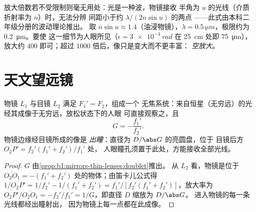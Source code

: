 \begin{remark}[分辨极限]\label{rem:b1:optical-instruments:abbe}
放大倍数若不受限制则毫无用处：光是一种波，物镜接收
半角为 $u$ 的光线（介质折射率为 $n$）时，无法分辨
间距小于约 $\lambda/(2n\sin u)$ 的两点
——此式由本科二年级分册的波动理论推出。
取 $n\sin u \approx 1.4$（油浸物镜），$\lambda =
\qty{0.5}{\micro m}$，极限约为 \qty{0.2}{\micro m}。要使
这一细节为人眼所见（$\epsilon = \qty{3e-4}{rad}$
在 \qty{25}{cm} 处即 \qty{75}{\micro m}），放大约 $400$
即可；超过 $1000$ 倍后，像只是变大而不更丰富：
\emph{空放大}。
\end{remark}

\section{天文望远镜}

\begin{proposition}[折射式望远镜]\label{prop:b1:optical-instruments:telescope}
物镜 $L_1$ 与目镜 $L_2$ 满足 $F_1' = F_2$，组成一个
无焦系统：来自恒星（无穷远）的光经其成像于无穷远，放松状态下的人眼
可直接观察之，且
\[
G = -\frac{f_1'}{f_2'} .
\]
物镜边缘经目镜所成的像是
\emph{出瞳}：直径为 $D/\abs G$ 的亮圆盘，位于
目镜后方 $\overline{O_2P'} = f_2'(f_1' + f_2')/f_1'$ 处，
人眼瞳孔须置于此处，方能接收全部光线。
\end{proposition}

\begin{proof}
$G$ 由\cref{prop:b1:mirrors-thin-lenses:doublet}推出。
从 $L_2$ 看，物镜是位于 $\overline{O_2O_1} = -(f_1'
+ f_2')$ 处的物体；由笛卡儿公式得 $1/\overline{O_2P'} = 1/f_2' - 1/(f_1' + f_2')
= f_1'/[f_2'(f_1' + f_2')]$，放大率为 $\overline{O_2P'}/
\overline{O_2O_1} = -f_2'/f_1' = 1/G$，即直径 $D$ 缩放为 $D/\abs G$。
进入物镜的每一条光线都经出瞳射出，
因为物镜上每一点都在此成像。
\end{proof}

